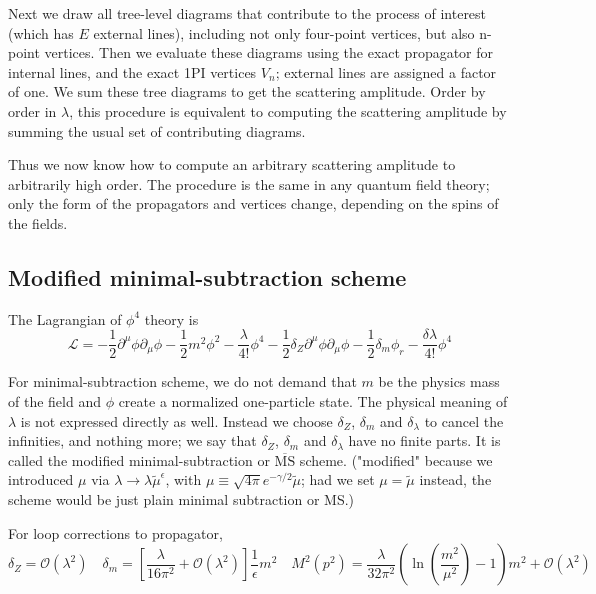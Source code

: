 Next we draw all tree-level diagrams that contribute to the process of interest (which has $E$ external lines), including not only four-point vertices, but also n-point vertices. Then we evaluate these diagrams using the exact propagator for internal lines, and the exact 1PI vertices $V_n$; external lines are assigned a factor of one. We sum these tree diagrams to get the scattering amplitude. Order by order in $\lambda$, this procedure is equivalent to computing the scattering amplitude by summing the usual set of contributing diagrams.

Thus we now know how to compute an arbitrary scattering amplitude
to arbitrarily high order. The procedure is the same in any quantum field theory; only the form of the propagators and vertices change, depending on the spins of the fields.


\subsection{Modified minimal-subtraction scheme}
The Lagrangian of $\phi^4$ theory is
\[\mathcal{L} = -\frac{1}{2} \partial^{\mu} \phi \partial_{\mu} \phi -\frac{1}{2}m^2 \phi^2 - \frac{\lambda}{4!}\phi^4 -\frac{1}{2} \delta_Z \partial^{\mu} \phi \partial_{\mu} \phi -\frac{1}{2}\delta_m \phi_r - \frac{\delta \lambda}{4!}\phi^4\]

For minimal-subtraction scheme, we do not demand that $m$ be the physics mass of the field and $\phi$  create a normalized one-particle state. The physical meaning of $\lambda$ is not expressed directly as well. Instead we choose $\delta_Z$, $\delta_m$ and $\delta_{\lambda}$ to cancel the infinities, and nothing more;
we say that $\delta_Z$, $\delta_m$ and $\delta_{\lambda}$ have no finite parts. It is called the modified minimal-subtraction or $\mathrm{\overline{MS}}$ scheme. ("modified" because we introduced $\mu$ via  $\lambda \to \lambda \tilde{\mu}^{\epsilon}$, with $\mu \equiv  \sqrt{4\pi} e^{-\gamma/2} \tilde{\mu}$; had we set $\mu = \tilde{\mu}$ instead, the scheme would be just plain minimal subtraction or MS.)

For loop corrections to propagator,
\[\delta_Z=\mathcal{O}(\lambda^2) \quad \delta_m = \left[ \frac{\lambda}{16\pi^2} + \mathcal{O}(\lambda^2) \right]\frac{1}{\epsilon}m^2 \quad M^2(p^2) = \frac{\lambda}{32\pi^2}( \ln(\frac{m^2}{\mu^2})-1)m^2 + \mathcal{O}(\lambda^2)\]

